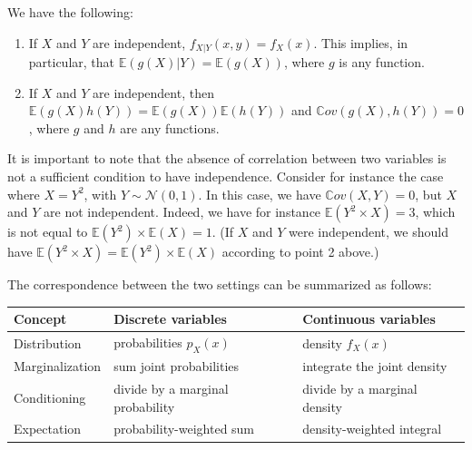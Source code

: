 \documentclass[
  11pt,
]{book}
\providecommand{\tightlist}{%
  \setlength{\itemsep}{0pt}\setlength{\parskip}{0pt}}
\theoremstyle{definition}
\theoremstyle{definition}
\theoremstyle{definition}
\theoremstyle{definition}
\theoremstyle{remark}
\begin{document}
We have the following:

\begin{enumerate}
\def\labelenumi{\arabic{enumi}.}
\tightlist
\item
  If \(X\) and \(Y\) are independent, \(f_{X|Y}(x,y)=f_{X}(x)\). This implies, in particular, that \(\mathbb{E}(g(X)|Y)=\mathbb{E}(g(X))\), where \(g\) is any function.
\item
  If \(X\) and \(Y\) are independent, then \(\mathbb{E}(g(X)h(Y))=\mathbb{E}(g(X))\mathbb{E}(h(Y))\) and \(\mathbb{C}ov(g(X),h(Y))=0\), where \(g\) and \(h\) are any functions.
\end{enumerate}

It is important to note that the absence of correlation between two variables is not a sufficient condition to have independence. Consider for instance the case where \(X=Y^2\), with \(Y \sim\mathcal{N}(0,1)\). In this case, we have \(\mathbb{C}ov(X,Y)=0\), but \(X\) and \(Y\) are not independent. Indeed, we have for instance \(\mathbb{E}(Y^2 \times X)=3\), which is not equal to \(\mathbb{E}(Y^2) \times \mathbb{E}(X)=1\). (If \(X\) and \(Y\) were independent, we should have \(\mathbb{E}(Y^2 \times X)=\mathbb{E}(Y^2) \times \mathbb{E}(X)\) according to point 2 above.)


The correspondence between the two settings can be summarized as follows:

\begin{longtable}[]{@{}
  >{\raggedright\arraybackslash}p{}
  >{\raggedright\arraybackslash}p{}
  >{\raggedright\arraybackslash}p{}@{}}
\toprule\noalign{}
\begin{minipage}[b]{\linewidth}\raggedright
Concept
\end{minipage} & \begin{minipage}[b]{\linewidth}\raggedright
Discrete variables
\end{minipage} & \begin{minipage}[b]{\linewidth}\raggedright
Continuous variables
\end{minipage} \\
\midrule\noalign{}
\endhead
\bottomrule\noalign{}
\endlastfoot
Distribution & probabilities \(p_X(x)\) & density \(f_X(x)\) \\
Marginalization & sum joint probabilities & integrate the joint density \\
Conditioning & divide by a marginal probability & divide by a marginal density \\
Expectation & probability-weighted sum & density-weighted integral \\
\end{longtable}
\end{document}
